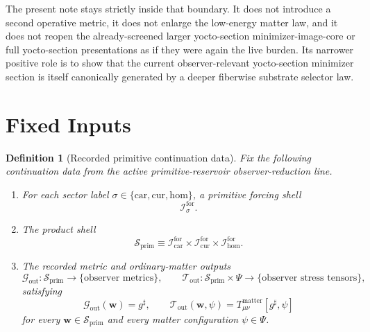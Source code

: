 \documentclass[11pt]{article}
\newcommand{\CompletedMetric}{g^{\sharp}}
\newcommand{\MatterSpace}{\Psi}
\newcommand{\Car}{\mathrm{car}}
\newcommand{\Cur}{\mathrm{cur}}
\newcommand{\Hom}{\mathrm{hom}}
\newcommand{\ForSpace}[1]{\mathcal I_{#1}^{\mathrm{for}}}
\newcommand{\PrimShell}{\mathcal S_{\mathrm{prim}}}
\newcommand{\MetricOut}{\mathscr G_{\mathrm{out}}}
\newcommand{\MatterOut}{\mathscr T_{\mathrm{out}}}
\newtheorem{definition}{Definition}
\begin{document}
The present note stays strictly inside that boundary. It does not introduce a second operative metric, it does not enlarge the low-energy matter law, and it does not reopen the already-screened larger yocto-section minimizer-image-core or full yocto-section presentations as if they were again the live burden. Its narrower positive role is to show that the current observer-relevant yocto-section minimizer section is itself canonically generated by a deeper fiberwise substrate selector law.

\section{Fixed Inputs}

\begin{definition}[Recorded primitive continuation data]
\label{def:fixed}
Fix the following continuation data from the active primitive-reservoir observer-reduction line.
\begin{enumerate}
    \item For each sector label \(\sigma\in\{\Car,\Cur,\Hom\}\), a primitive forcing shell
    \[
    \ForSpace{\sigma}.
    \]
    \item The product shell
    \[
    \PrimShell
    \equiv
    \ForSpace{\Car}\times \ForSpace{\Cur}\times \ForSpace{\Hom}.
    \]
    \item The recorded metric and ordinary-matter outputs
    \[
    \MetricOut:\PrimShell\to\{\text{observer metrics}\},
    \qquad
    \MatterOut:\PrimShell\times\MatterSpace\to\{\text{observer stress tensors}\},
    \]
    satisfying
    \begin{equation}
    \MetricOut(\mathbf w)=\CompletedMetric,
    \qquad
    \MatterOut(\mathbf w,\psi)
    =
    T_{\mu\nu}^{\mathrm{matter}}[\CompletedMetric,\psi]
    \label{eq:fixedoutputs}
    \end{equation}
    for every \(\mathbf w\in\PrimShell\) and every matter configuration \(\psi\in\MatterSpace\).
\end{enumerate}
\end{definition}
\end{document}
